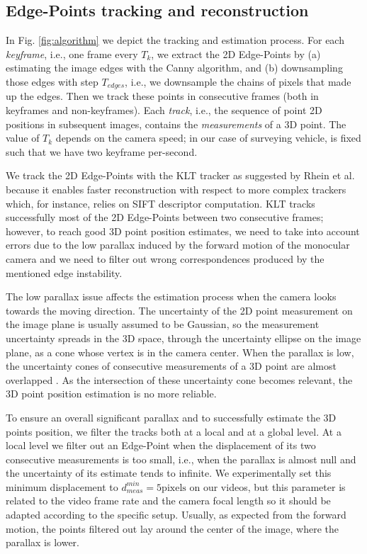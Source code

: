 

\subsection{Edge-Points tracking and reconstruction}
\label{subsubsec:Edge-Point-tracking}
In Fig. \ref{fig:algorithm} we depict the tracking and estimation process.
For each \emph{keyframe}, i.e., one frame every $T_k$, we extract the 2D Edge-Points by (a) estimating the image edges with the Canny algorithm, and (b) downsampling those edges with step $T_{edges}$, i.e., we downsample the chains of pixels that made up the edges. 
Then we track these points in consecutive frames (both in keyframes and non-keyframes). Each \emph{track}, i.e., the sequence of point 2D positions in subsequent images, contains the \emph{measurements} of a 3D point. The value of $T_k$ depends on the camera speed; in our case of surveying vehicle, is fixed such that we have two keyframe per-second. 


We track the 2D Edge-Points with the KLT tracker \cite{Lucas_Kanade81} as suggested by Rhein et al. \cite{Rhein_et_al13} because it enables faster reconstruction with respect to more complex trackers which, for instance, relies on SIFT descriptor computation.
KLT tracks successfully most of the 2D Edge-Points between two consecutive frames; however, to reach good 3D point position estimates, we need to take into account errors due to the low parallax induced by the forward motion of the monocular camera and we need to filter out wrong correspondences produced by the mentioned edge instability. 


The low parallax issue affects the estimation process when the camera looks towards the moving direction. The uncertainty of the 2D point measurement on the image plane is usually assumed to be Gaussian, so the measurement uncertainty spreads in the 3D space, through the uncertainty ellipse on the image plane, as a cone whose vertex is in the camera center. 
When the parallax is low, the uncertainty cones of consecutive measurements of a 3D point are almost overlapped \cite{HaZi04}. As the intersection of these uncertainty cone becomes relevant, the 3D point position estimation is no more reliable.

To ensure  an overall significant parallax and to successfully estimate the 3D points position, we filter the tracks  both at a local and at a global level.
At a local level we filter out an Edge-Point when the displacement of its two consecutive measurements is too small, i.e., when the parallax is almost null and the uncertainty of its estimate tends to infinite. 
We experimentally set this minimum displacement to $d_{meas}^{min} = 5 \text{pixels}$ on our videos, but this parameter is related to the video frame rate and the camera focal length so it should be adapted according to the specific setup. 
Usually, as expected from the forward motion, the points filtered out lay around the center of the image, where the parallax is lower.

